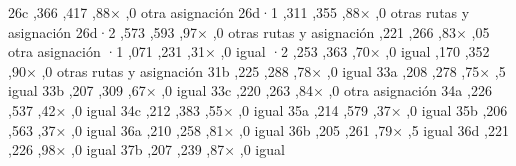 	\bTR \bTD 26c \eTD {},366 \eTD {},417 \eTD {},88× \eTD {},0 \eTD \bTD otra asignación \eTD \eTR
	\bTR \bTD 26d·1 \eTD {},311 \eTD {},355 \eTD {},88× \eTD {},0 \eTD \bTD otras rutas y asignación \eTD \eTR
	\bTR \bTD 26d·2 \eTD {},573 \eTD {},593 \eTD {},97× \eTD {},0 \eTD \bTD otras rutas y asignación \eTD \eTR
	\bTR {} \eTD {},221 \eTD {},266 \eTD {},83× \eTD {},05 \eTD \bTD otra asignación \eTD \eTR
	\bTR {}·1 \eTD {},071 \eTD {},231 \eTD {},31× \eTD {},0 \eTD \bTD igual \eTD \eTR
	\bTR {}·2 \eTD {},253 \eTD {},363 \eTD {},70× \eTD {},0 \eTD \bTD igual \eTD \eTR
	\bTR {} \eTD {},170 \eTD {},352 \eTD {},90× \eTD {},0 \eTD \bTD otras rutas y asignación \eTD \eTR
	\bTR \bTD 31b \eTD {},225 \eTD {},288 \eTD {},78× \eTD {},0 \eTD \bTD igual \eTD \eTR
	\bTR \bTD 33a \eTD {},208 \eTD {},278 \eTD {},75× \eTD {},5 \eTD \bTD igual \eTD \eTR
	\bTR \bTD 33b \eTD {},207 \eTD {},309 \eTD {},67× \eTD {},0 \eTD \bTD igual \eTD \eTR
	\bTR \bTD 33c \eTD {},220 \eTD {},263 \eTD {},84× \eTD {},0 \eTD \bTD otra asignación \eTD \eTR
	\bTR \bTD 34a \eTD {},226 \eTD {},537 \eTD {},42× \eTD {},0 \eTD \bTD igual \eTD \eTR
	\bTR \bTD 34c \eTD {},212 \eTD {},383 \eTD {},55× \eTD {},0 \eTD \bTD igual \eTD \eTR
	\bTR \bTD 35a \eTD {},214 \eTD {},579 \eTD {},37× \eTD {},0 \eTD \bTD igual \eTD \eTR
	\bTR \bTD 35b \eTD {},206 \eTD {},563 \eTD {},37× \eTD {},0 \eTD \bTD igual \eTD \eTR
	\bTR \bTD 36a \eTD {},210 \eTD {},258 \eTD {},81× \eTD {},0 \eTD \bTD igual \eTD \eTR
	\bTR \bTD 36b \eTD {},205 \eTD {},261 \eTD {},79× \eTD {},5 \eTD \bTD igual \eTD \eTR
	\bTR \bTD 36d \eTD {},221 \eTD {},226 \eTD {},98× \eTD {},0 \eTD \bTD igual \eTD \eTR
	\bTR \bTD 37b \eTD {},207 \eTD {},239 \eTD {},87× \eTD {},0 \eTD \bTD igual \eTD \eTR
	\eTABLEbody
	\eTABLE
\stopplacetable

